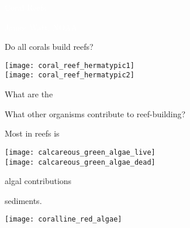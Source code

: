 \documentclass[t]{beamer}
\begin{document}

{
\begin{frame}[b]{\hfill\textcolor{white}{Coral Reefs}}

\tiny\hfill\textcolor{white}{James Watt, NOAA}
\end{frame}
}

\begin{frame}[t]{Do all  corals build reefs?}
\begin{multicols}{2}

\begin{center}
\texttt{[image: coral\_reef\_hermatypic1]} \\[1ex]

\texttt{[image: coral\_reef\_hermatypic2]} 
\end{center}

\columnbreak

	\hangpara What are the 
	
	\hangpara What other organisms contribute to reef-building?


\end{multicols}

\end{frame}


\begin{frame}[t]{Most  in reefs is }
\begin{multicols}{2}

\begin{center}
\texttt{[image: calcareous\_green\_algae\_live]} \\[1ex]

\texttt{[image: calcareous\_green\_algae\_dead]} 
\end{center}

\columnbreak

	\hangpara algal contributions
	
	\hangpara sediments.
	
	\vspace*{5\baselineskip}

	\texttt{[image: coralline\_red\_algae]} 

\end{multicols}

\end{frame}
\end{document}
